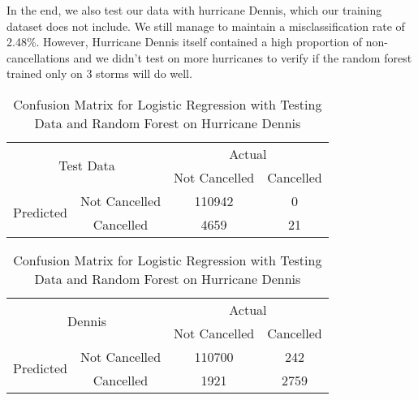 In the end, we also test our data with hurricane Dennis, which our training dataset does not include. We still manage to maintain a misclassification rate of 2.48\%. However, Hurricane Dennis itself contained a high proportion of non-cancellations and we didn't test on more hurricanes to verify if the random forest trained only on 3 storms will do well. 


\begin{table}[H]
\centering
\begin{subtable}{.5\textwidth}
\centering
\begin{tabular}{@{}|c|c|c|c|@{}}
\toprule
\multicolumn{2}{|c|}{\multirow{2}{*}{Test Data}} & \multicolumn{2}{c|}{Actual} \\ \cmidrule(l){3-4} 
\multicolumn{2}{|c|}{}                        & Not Cancelled          & Cancelled         \\ \midrule
\multirow{2}{*}{Predicted}       & Not Cancelled        & 110942        & 0 \\ \cmidrule(l){2-4} 
                                 & Cancelled       & 4659         & 21        \\ \bottomrule
\end{tabular}

\begin{tabular}{@{}|c|c|c|c|@{}}
\toprule
\multicolumn{2}{|c|}{\multirow{2}{*}{Dennis}} & \multicolumn{2}{c|}{Actual} \\ \cmidrule(l){3-4} 
\multicolumn{2}{|c|}{}                        & Not Cancelled         &  Cancelled         \\ \midrule
\multirow{2}{*}{Predicted}       & Not Cancelled       & 110700   	  & 242 \\ \cmidrule(l){2-4} 
                                 & Cancelled       & 1921 		  & 2759 \\ \bottomrule
\end{tabular}
\end{subtable}
\caption{Confusion Matrix for Logistic Regression with Testing Data and Random Forest on Hurricane Dennis}
\label{Confusion_MLP}
\end{table}

